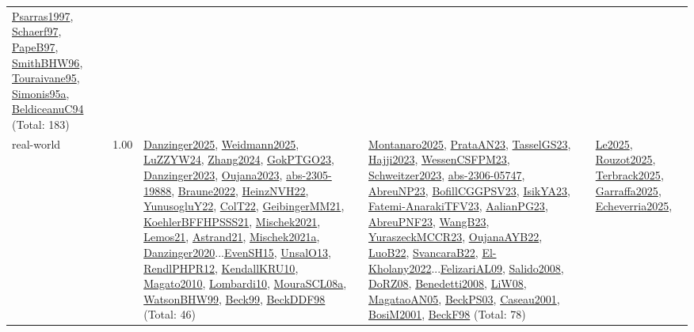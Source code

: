 {\begin{longtable}{p{3cm}r>{\raggedright\arraybackslash}p{6cm}>{\raggedright\arraybackslash}p{6cm}>{\raggedright\arraybackslash}p{8cm}}
\hyperref[detail:Psarras1997]{Psarras1997}, \hyperref[detail:Schaerf97]{Schaerf97}, \hyperref[detail:PapeB97]{PapeB97}, \hyperref[detail:SmithBHW96]{SmithBHW96}, \hyperref[detail:Touraivane95]{Touraivane95}, \hyperref[detail:Simonis95a]{Simonis95a}, \hyperref[detail:BeldiceanuC94]{BeldiceanuC94} (Total: 183)\\
\index{real-world}\index{Benchmarks!real-world}real-world &  1.00 & \hyperref[detail:Danzinger2025]{Danzinger2025}, \hyperref[detail:Weidmann2025]{Weidmann2025}, \hyperref[detail:LuZZYW24]{LuZZYW24}, \hyperref[detail:Zhang2024]{Zhang2024}, \hyperref[detail:GokPTGO23]{GokPTGO23}, \hyperref[detail:Danzinger2023]{Danzinger2023}, \hyperref[detail:Oujana2023]{Oujana2023}, \hyperref[detail:abs-2305-19888]{abs-2305-19888}, \hyperref[detail:Braune2022]{Braune2022}, \hyperref[detail:HeinzNVH22]{HeinzNVH22}, \hyperref[detail:YunusogluY22]{YunusogluY22}, \hyperref[detail:ColT22]{ColT22}, \hyperref[detail:GeibingerMM21]{GeibingerMM21}, \hyperref[detail:KoehlerBFFHPSSS21]{KoehlerBFFHPSSS21}, \hyperref[detail:Mischek2021]{Mischek2021}, \hyperref[detail:Lemos21]{Lemos21}, \hyperref[detail:Astrand21]{Astrand21}, \hyperref[detail:Mischek2021a]{Mischek2021a}, \hyperref[detail:Danzinger2020]{Danzinger2020}...\hyperref[detail:EvenSH15]{EvenSH15}, \hyperref[detail:UnsalO13]{UnsalO13}, \hyperref[detail:RendlPHPR12]{RendlPHPR12}, \hyperref[detail:KendallKRU10]{KendallKRU10}, \hyperref[detail:Magato2010]{Magato2010}, \hyperref[detail:Lombardi10]{Lombardi10}, \hyperref[detail:MouraSCL08a]{MouraSCL08a}, \hyperref[detail:WatsonBHW99]{WatsonBHW99}, \hyperref[detail:Beck99]{Beck99}, \hyperref[detail:BeckDDF98]{BeckDDF98} (Total: 46) & \hyperref[detail:Montanaro2025]{Montanaro2025}, \hyperref[detail:PrataAN23]{PrataAN23}, \hyperref[detail:TasselGS23]{TasselGS23}, \hyperref[detail:Hajji2023]{Hajji2023}, \hyperref[detail:WessenCSFPM23]{WessenCSFPM23}, \hyperref[detail:Schweitzer2023]{Schweitzer2023}, \hyperref[detail:abs-2306-05747]{abs-2306-05747}, \hyperref[detail:AbreuNP23]{AbreuNP23}, \hyperref[detail:BofillCGGPSV23]{BofillCGGPSV23}, \hyperref[detail:IsikYA23]{IsikYA23}, \hyperref[detail:Fatemi-AnarakiTFV23]{Fatemi-AnarakiTFV23}, \hyperref[detail:AalianPG23]{AalianPG23}, \hyperref[detail:AbreuPNF23]{AbreuPNF23}, \hyperref[detail:WangB23]{WangB23}, \hyperref[detail:YuraszeckMCCR23]{YuraszeckMCCR23}, \hyperref[detail:OujanaAYB22]{OujanaAYB22}, \hyperref[detail:LuoB22]{LuoB22}, \hyperref[detail:SvancaraB22]{SvancaraB22}, \hyperref[detail:El-Kholany2022]{El-Kholany2022}...\hyperref[detail:FelizariAL09]{FelizariAL09}, \hyperref[detail:Salido2008]{Salido2008}, \hyperref[detail:DoRZ08]{DoRZ08}, \hyperref[detail:Benedetti2008]{Benedetti2008}, \hyperref[detail:LiW08]{LiW08}, \hyperref[detail:MagataoAN05]{MagataoAN05}, \hyperref[detail:BeckPS03]{BeckPS03}, \hyperref[detail:Caseau2001]{Caseau2001}, \hyperref[detail:BosiM2001]{BosiM2001}, \hyperref[detail:BeckF98]{BeckF98} (Total: 78) & \hyperref[detail:Le2025]{Le2025}, \hyperref[detail:Rouzot2025]{Rouzot2025}, \hyperref[detail:Terbrack2025]{Terbrack2025}, \hyperref[detail:Garraffa2025]{Garraffa2025}, \hyperref[detail:Echeverria2025]{Echeverria2025}, 
\end{longtable}}
